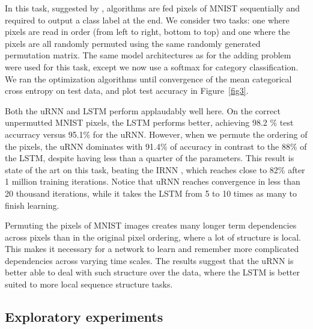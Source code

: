 \documentclass{article} %
\begin{document}
In this task, suggested by \cite{Quoc2015}, algorithms are fed pixels of MNIST \citep{MNIST} sequentially and required to output a 
class label at the end. We consider two tasks: one where pixels are read in order (from left to right,
bottom to top) and one where the pixels are all randomly permuted using the same randomly generated
permutation matrix. The same model architectures as for the adding problem were used for this task, except we now use a 
softmax for category classification. We ran the optimization algorithms until convergence of the 
mean categorical cross entropy on test data, and plot test accuracy in Figure~\ref{fig3}.

Both the uRNN and LSTM perform applaudably well here.
On the correct unpermutted MNIST pixels, the LSTM performs better, achieving 98.2 \% 
test accurracy versus 95.1\% for the uRNN. 
However, when we permute the ordering of the pixels, the uRNN dominates with 91.4\% of accuracy in 
contrast to the 88\% of the LSTM, despite having less than a quarter of the parameters. 
This result is state of the art on this task, beating the IRNN \citep{Quoc2015}, which reaches 
close to 82\% after 1 million training iterations. Notice that uRNN reaches convergence in less 
than 20 thousand iterations, while it takes the LSTM from 5 to 10 times as many to finish learning.

Permuting the pixels of MNIST images creates many longer term dependencies across pixels than in the 
original pixel ordering, where a lot of structure is local. This makes it necessary for a network to 
learn and remember more complicated dependencies across varying time scales. 
The results suggest that the uRNN is better able to deal with such structure over the data, where the 
LSTM is better suited to more local sequence structure tasks.  


\subsection{Exploratory experiments}
\end{document}
